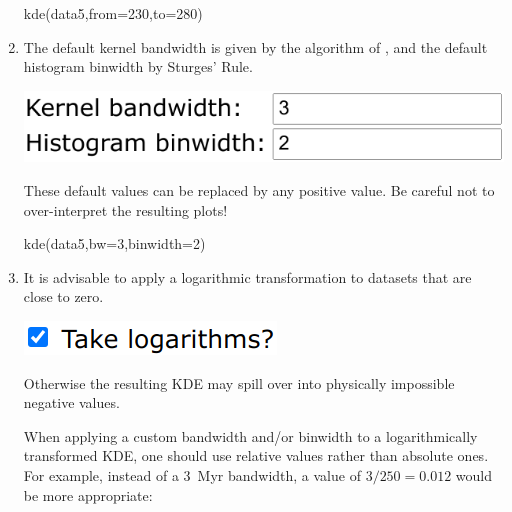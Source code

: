 \begin{refsection}
\begin{enumerate}
\begin{console}
kde(data5,from=230,to=280)
\end{console}

\item The default kernel bandwidth is given by the algorithm of
  \citet{botev2010}, and the default histogram binwidth by Sturges'
  Rule.

\noindent\begin{minipage}[t]{.4\linewidth}
\strut\vspace*{-\baselineskip}\newline
\includegraphics[width=\linewidth]{../figures/OtherKDEbandbin.png}
\end{minipage}
\begin{minipage}[t]{.6\linewidth}
  These default values can be replaced by any positive value.  Be
  careful not to over-interpret the resulting plots!
\end{minipage}

\begin{console}
kde(data5,bw=3,binwidth=2)
\end{console}

\item It is advisable to apply a logarithmic transformation to
  datasets that are close to zero.

\noindent\begin{minipage}[t]{.2\linewidth}
\strut\vspace*{-\baselineskip}\newline
\includegraphics[width=\linewidth]{../figures/UPbKDElogarithm.png}
\end{minipage}
\begin{minipage}[t]{.8\linewidth}
Otherwise the resulting KDE may spill over into physically impossible
negative values.
\end{minipage}

When applying a custom bandwidth and/or binwidth to a logarithmically
transformed KDE, one should use relative values rather than absolute
ones. For example, instead of a 3~Myr bandwidth, a value of
$3/250=0.012$ would be more appropriate:


\end{enumerate}
\end{refsection}
